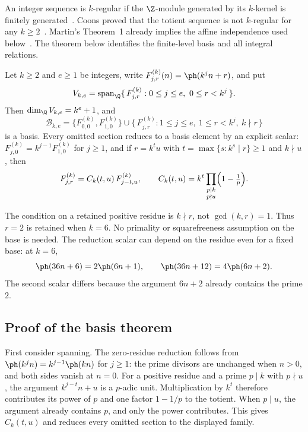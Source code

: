 \documentclass[11pt]{article}
\begin{document}
An integer sequence is $k$-regular if the $\Z$-module generated by its
$k$-kernel is finitely generated~\cite{allouche-shallit}. Coons proved that the totient sequence is
not $k$-regular for any $k\ge2$~\cite[Thm.~3.2]{coons}.
Martin's Theorem~1 already implies the affine independence used
below~\cite[Thm.~1]{martin-phi-inequalities}. The theorem below
identifies the finite-level basis and all integral relations.
\begin{theorem}
\label{thm:kkernelrank}
Let $k\ge2$ and $e\ge1$ be integers, write $F^{(k)}_{j,r}(n)=\ph(k^jn+r)$, and put
\[
 V_{k,e}=\operatorname{span}_{\Q}
 \{\,F^{(k)}_{j,r}:0\le j\le e,\ 0\le r<k^j\,\}.
\]
Then $\dim_{\Q}V_{k,e}=k^e+1$, and
\[
 \mathcal B_{k,e}
 =\{F^{(k)}_{0,0},F^{(k)}_{1,0}\}
 \cup\{\,F^{(k)}_{j,r}:1\le j\le e,\ 1\le r<k^j,\ k\nmid r\,\}
\]
is a basis.  Every omitted section reduces to a basis element by an explicit
scalar: $F^{(k)}_{j,0}=k^{j-1}F^{(k)}_{1,0}$ for $j\ge1$, and if $r=k^tu$ with
$t=\max\{s:k^s\mid r\}\ge1$ and $k\nmid u$, then
\[
 F^{(k)}_{j,r}=C_k(t,u)\,F^{(k)}_{j-t,u},
 \qquad
 C_k(t,u)=k^t\prod_{\substack{p\mid k\\ p\nmid u}}\Bigl(1-\tfrac1p\Bigr).
\]
\end{theorem}
The condition on a retained positive residue is $k\nmid r$, not
$\gcd(k,r)=1$. Thus $r=2$ is retained when $k=6$. No primality or
squarefreeness assumption on the base is needed. The reduction scalar can
depend on the residue even for a fixed base: at $k=6$,
\[
 \ph(36n+6)=2\ph(6n+1),\qquad
 \ph(36n+12)=4\ph(6n+2).
\]
The second scalar differs because the argument $6n+2$ already contains
the prime $2$.

\subsection{Proof of the basis theorem}\label{sec:rank}
First consider spanning. The zero-residue reduction follows from
$\ph(k^jn)=k^{j-1}\ph(kn)$ for $j\ge1$: the prime divisors are unchanged
when $n>0$, and both sides vanish at $n=0$.
For a positive residue and a prime $p\mid k$ with $p\nmid u$,
the argument $k^{j-t}n+u$ is a $p$-adic unit. Multiplication by $k^t$
therefore contributes its power of $p$ and one factor $1-1/p$ to the
totient. When $p\mid u$, the argument already contains $p$, and only
the power contributes. This gives $C_k(t,u)$ and reduces every omitted
section to the displayed family.
\end{document}
